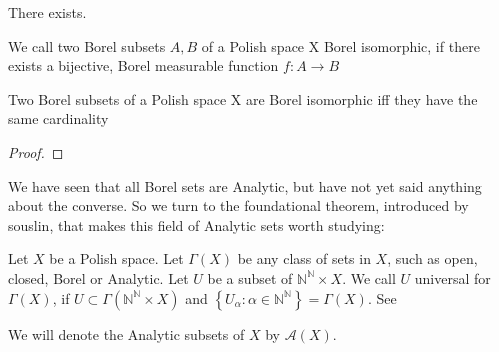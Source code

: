 \documentclass[10pt, a4paper, titlepage]{article}
\numberwithin{equation}{section}
\begin{document}
\begin{theorem}
	There exists.
\end{theorem}



\begin{definition}
	We call two Borel subsets $A,B$ of a Polish space X Borel isomorphic, if there exists a bijective, Borel measurable function $f: A \to B$
\end{definition}


\begin{theorem}
	Two Borel subsets of a Polish space X are Borel isomorphic iff they have the same cardinality
\end{theorem}
\begin{proof}
	
\end{proof}


We have seen that all Borel sets are Analytic, but have not yet said anything about the converse. So we turn to the foundational theorem, introduced by souslin, that makes this field of Analytic sets worth studying:
\begin{definition}
Let $X$ be a Polish space. 
Let $\Gamma\left( X \right) $ be any class of sets in $X$, such as open, closed, Borel or Analytic. 
Let $U$ be a subset of $\mathbb{N}^\mathbb{N} \times X $. 
We call $U$ universal for  $\Gamma\left( X \right) $, 
if $U \subset \Gamma\left( \mathbb{N}^\mathbb{N} \times X \right) $ and $\left\{ U_{\alpha}\colon \alpha \in \mathbb{N}^\mathbb{N} \right\} = \Gamma\left( X \right) $. See \cite{kechris1995}
\end{definition}
\begin{remark}
	
We will denote the Analytic subsets of $X$ by $\mathcal{A}\left( X \right) $. 
\end{remark}
\end{document}
